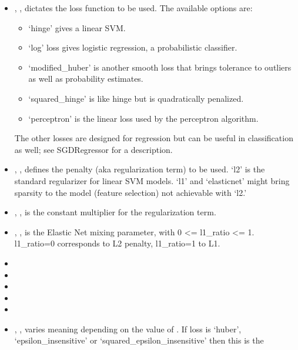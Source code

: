 \begin{itemize}
  \item {}, ,
  dictates the loss function to be used.
  The available options are:
  \begin{itemize}
    \item `hinge' gives a linear SVM.
    \item `log' loss gives logistic regression, a probabilistic classifier.
    \item `modified\_huber' is another smooth loss that brings tolerance to
    outliers as well as probability estimates.
    \item `squared\_hinge' is like hinge but is quadratically penalized.
    \item `perceptron' is the linear loss used by the perceptron algorithm.
  \end{itemize}
  The other losses are designed for regression but can be useful in
  classification as well; see SGDRegressor for a description.
  \item {}, , defines
  the penalty (aka regularization term) to be used.
  `l2' is the standard regularizer for linear SVM models.
  `l1' and `elasticnet' might bring sparsity to the model (feature
  selection) not achievable with `l2.'
  \item {}, , is the constant multiplier for the
  regularization term.
  \item {}, , is the Elastic Net mixing
  parameter, with 0 <= l1\_ratio <= 1.
  l1\_ratio=0 corresponds to L2 penalty, l1\_ratio=1 to L1.
  \item {}
  \item {}
  \item {}
  \item {}
  \item {}
  \item {}, , varies meaning
  depending on the value of . If loss is `huber',
  `epsilon\_insensitive' or `squared\_epsilon\_insensitive' then this is the

\end{itemize}

